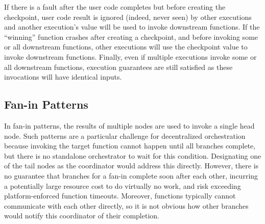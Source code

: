 If there is a fault after the user code completes but before creating the
checkpoint, user code result is ignored (indeed, never seen) by other
executions and another execution's value will be used to invoke downstream
functions.  If the ``winning'' function crashes after creating a checkpoint,
and before invoking some or all downstream functions, other executions will
use the checkpoint value to invoke downstream functions. Finally, even if
multiple executions invoke some or all downstream functions, execution
guarantees are still satisfied as these invocations will have identical
inputs.



\subsection{Fan-in Patterns}\label{sec:design:fanin}

In fan-in patterns, the results of multiple nodes are used to invoke a single
head node. Such patterns are a particular challenge for decentralized
orchestration because invoking the target function cannot happen until all
branches complete, but there is no standalone orchestrator to wait for this
condition. Designating one of the tail nodes as the coordinator would address
this directly. However, there is no guarantee that branches for a fan-in
complete soon after each other, incurring a potentially large resource cost to
do virtually no work, and risk exceeding platform-enforced function timeouts.
Moreover, functions typically cannot communicate with each other directly, so
it is not obvious how other branches would notify this coordinator of their
completion.

